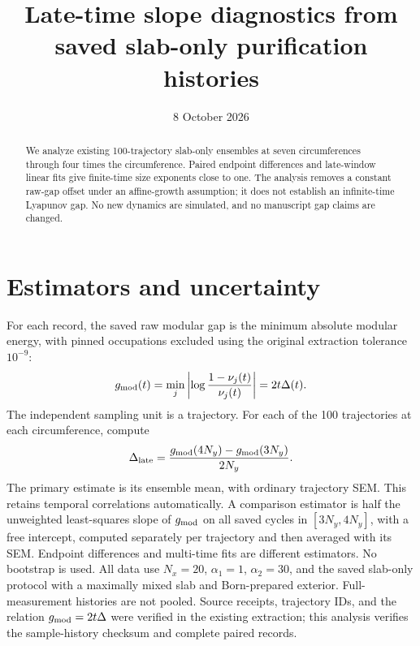 \documentclass[aps,prb,onecolumn,nofootinbib,superscriptaddress]{revtex4-2}
\begin{document}
\title{Late-time slope diagnostics from saved slab-only purification histories}
\date{8 October 2026}
\begin{abstract}
We analyze existing 100-trajectory slab-only ensembles at seven circumferences through four times the circumference. Paired endpoint differences and late-window linear fits give finite-time size exponents close to one. The analysis removes a constant raw-gap offset under an affine-growth assumption; it does not establish an infinite-time Lyapunov gap. No new dynamics are simulated, and no manuscript gap claims are changed.
\end{abstract}
\maketitle
\setcounter{tocdepth}{2}
\tableofcontents
\section{Estimators and uncertainty}
For each record, the saved raw modular gap is the minimum absolute modular energy, with pinned occupations excluded using the original extraction tolerance $10^{-9}$:
\begin{equation}
g_{\rm mod}(t)=\min_j\left|\log\frac{1-\nu_j(t)}{\nu_j(t)}\right|=2t\Delta(t).
\end{equation}
The independent sampling unit is a trajectory. For each of the 100 trajectories at each circumference, compute
\begin{equation}
\Delta_{\rm late}=\frac{g_{\rm mod}(4N_y)-g_{\rm mod}(3N_y)}{2N_y}.
\end{equation}
The primary estimate is its ensemble mean, with ordinary trajectory SEM. This retains temporal correlations automatically. A comparison estimator is half the unweighted least-squares slope of $g_{\rm mod}$ on all saved cycles in $[3N_y,4N_y]$, with a free intercept, computed separately per trajectory and then averaged with its SEM. Endpoint differences and multi-time fits are different estimators. No bootstrap is used.
All data use $N_x=20$, $\alpha_1=1$, $\alpha_2=30$, and the saved slab-only protocol with a maximally mixed slab and Born-prepared exterior. Full-measurement histories are not pooled. Source receipts, trajectory IDs, and the relation $g_{\rm mod}=2t\Delta$ were verified in the existing extraction; this analysis verifies the sample-history checksum and complete paired records.
\end{document}

